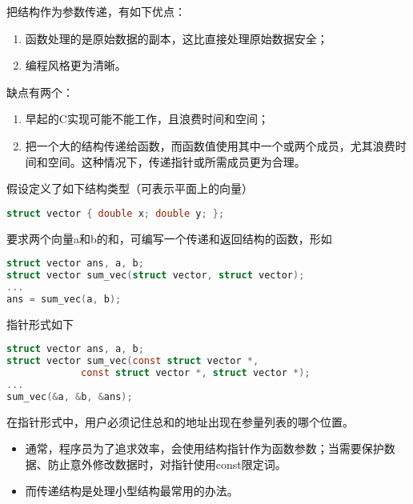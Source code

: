 \begin{frame}[fragile]\ft{\subsecname}
把结构作为参数传递，有如下优点：\vspace{0.1in}

\begin{enumerate}
\item 函数处理的是原始数据的副本，这比直接处理原始数据安全；\\[0.1in]
\item 编程风格更为清晰。
\end{enumerate}\vspace{0.1in}

缺点有两个：\vspace{0.1in}

\begin{enumerate}
\item 早起的C实现可能不能工作，且浪费时间和空间；\\[0.1in]
\item 把一个大的结构传递给函数，而函数值使用其中一个或两个成员，尤其浪费时间和空间。这种情况下，传递指针或所需成员更为合理。
\end{enumerate}

\end{frame}

\begin{frame}[fragile]\ft{\subsecname}
假设定义了如下结构类型（可表示平面上的向量）
\begin{lstlisting}[language=c,backgroundcolor=\color{red!20}]
struct vector { double x; double y; };
\end{lstlisting}
要求两个向量a和b的和，可编写一个传递和返回结构的函数，形如
\begin{lstlisting}[language=c,backgroundcolor=\color{red!20}]
struct vector ans, a, b;
struct vector sum_vec(struct vector, struct vector);
...
ans = sum_vec(a, b);
\end{lstlisting}
\end{frame}

\begin{frame}[fragile]\ft{\subsecname}
指针形式如下
\begin{lstlisting}[language=c,backgroundcolor=\color{red!20}]
struct vector ans, a, b;
struct vector sum_vec(const struct vector *, 
             const struct vector *, struct vector *);
...
sum_vec(&a, &b, &ans);
\end{lstlisting}
在指针形式中，用户必须记住总和的地址出现在参量列表的哪个位置。
\end{frame}

\begin{frame}[fragile]\ft{\subsecname}
\begin{itemize}
\item
通常，程序员为了追求效率，会使用结构指针作为函数参数；当需要保护数据、防止意外修改数据时，对指针使用{\tf const}限定词。\\[0.1in]
\item
而传递结构是处理小型结构最常用的办法。
\end{itemize}
\end{frame}

